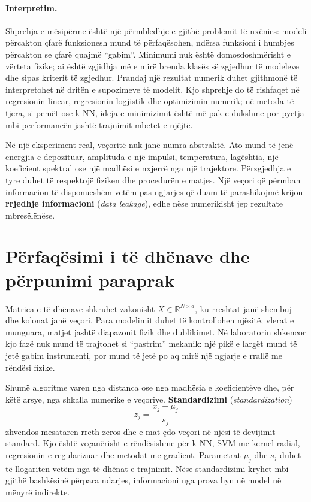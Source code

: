 \documentclass[12pt,a4paper,oneside]{book}
\newcommand{\term}[2]{\textbf{#1} (\textit{#2})}
\newcommand{\R}{\mathbb{R}}
\begin{document}
\paragraph{Interpretim.}
Shprehja e mësipërme është një përmbledhje e gjithë problemit të nxënies: modeli përcakton çfarë funksionesh mund të përfaqësohen, ndërsa funksioni i humbjes përcakton se çfarë quajmë ``gabim''. Minimumi nuk është domosdoshmërisht e vërteta fizike; ai është zgjidhja më e mirë brenda klasës së zgjedhur të modeleve dhe sipas kriterit të zgjedhur. Prandaj një rezultat numerik duhet gjithmonë të interpretohet në dritën e supozimeve të modelit.
Kjo shprehje do të rishfaqet në regresionin linear, regresionin logjistik dhe optimizimin numerik; në metoda të tjera, si pemët ose k-NN, ideja e minimizimit është më pak e dukshme por pyetja mbi performancën jashtë trajnimit mbetet e njëjtë.

Në një eksperiment real, veçoritë nuk janë numra abstraktë. Ato mund të jenë energjia e depozituar, amplituda e një impulsi, temperatura, lagështia, një koeficient spektral ose një madhësi e nxjerrë nga një trajektore. Përzgjedhja e tyre duhet të respektojë fiziken dhe procedurën e matjes. Një veçori që përmban informacion të disponueshëm vetëm pas ngjarjes që duam të parashikojmë krijon \term{rrjedhje informacioni}{data leakage}, edhe nëse numerikisht jep rezultate mbresëlënëse.

\section{Përfaqësimi i të dhënave dhe përpunimi paraprak}

Matrica e të dhënave shkruhet zakonisht $X\in\R^{N\times d}$, ku rreshtat janë shembuj dhe kolonat janë veçori. Para modelimit duhet të kontrollohen njësitë, vlerat e munguara, matjet jashtë diapazonit fizik dhe dublikimet. Në laboratorin shkencor kjo fazë nuk mund të trajtohet si ``pastrim'' mekanik: një pikë e largët mund të jetë gabim instrumenti, por mund të jetë po aq mirë një ngjarje e rrallë me rëndësi fizike.

Shumë algoritme varen nga distanca ose nga madhësia e koeficientëve dhe, për këtë arsye, nga shkalla numerike e veçorive. \term{Standardizimi}{standardization}
\[
z_j=\frac{x_j-\mu_j}{s_j}
\]
zhvendos mesataren rreth zeros dhe e mat çdo veçori në njësi të devijimit standard. Kjo është veçanërisht e rëndësishme për k-NN, SVM me kernel radial, regresionin e regularizuar dhe metodat me gradient. Parametrat $\mu_j$ dhe $s_j$ duhet të llogariten vetëm nga të dhënat e trajnimit. Nëse standardizimi kryhet mbi gjithë bashkësinë përpara ndarjes, informacioni nga prova hyn në model në mënyrë indirekte.
\end{document}
